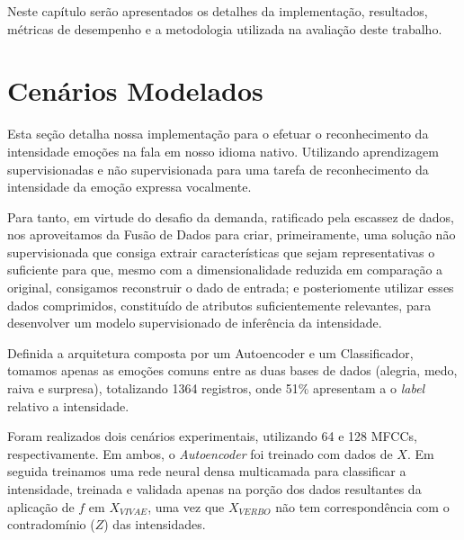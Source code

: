 
Neste capítulo serão apresentados os detalhes da implementação, resultados, métricas de desempenho e a metodologia utilizada na avaliação deste trabalho.\\

\section{Cenários Modelados}\label{sec:implementacao}

Esta seção detalha nossa implementação para o efetuar o reconhecimento da intensidade emoções na fala em nosso idioma nativo. Utilizando aprendizagem supervisionadas e não supervisionada para uma tarefa de reconhecimento da intensidade da emoção expressa vocalmente.

Para tanto, em virtude do desafio da demanda, ratificado pela escassez de dados, nos aproveitamos da Fusão de Dados para criar, primeiramente, uma solução não supervisionada que consiga extrair características que sejam representativas o suficiente para que, mesmo com a dimensionalidade reduzida em comparação a original, consigamos reconstruir o dado de entrada; e posteriomente utilizar esses dados comprimidos, constituído de atributos suficientemente relevantes, para desenvolver um modelo supervisionado de inferência da intensidade.

Definida a arquitetura composta por um Autoencoder e um Classificador, tomamos apenas as emoções comuns entre as duas bases de dados (alegria, medo, raiva e surpresa), totalizando 1364 registros, onde 51\% apresentam a o \textit{label} relativo a intensidade. %


Foram realizados dois cenários experimentais, utilizando 64 e 128 \acrshort{MFCC}s, respectivamente. Em ambos, o \textit{Autoencoder} foi treinado com dados de $X$. Em seguida treinamos uma rede neural densa multicamada para classificar a intensidade, treinada e validada apenas na porção dos dados resultantes da aplicação de $f$ em $X_{VIVAE}$, uma vez que $X_{VERBO}$ não tem correspondência com o contradomínio ($Z$) das intensidades.

